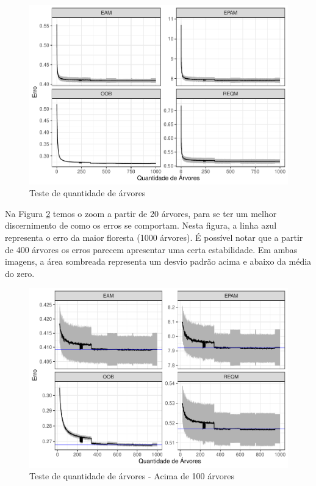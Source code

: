 \documentclass[
	12pt,				%
	a4paper,		%
	oneside,    %
	chapter=TITLE,		   %
	section=TITLE,		   %
	subsection=TITLE,	   %
	subsubsection=TITLE, %
	english,			%
	french,				%
	spanish,			%
	brazil,				%
]{abntex2}
\begin{document}
\begin{figure}
\centering
\includegraphics{00-TCC_files/figure-latex/qtd_arvores-1.pdf}
\caption{\label{qtd_arvores}Teste de quantidade de árvores}
\end{figure}

Na Figura \ref{qtd_arvores_zoom} temos o zoom a partir de 20 árvores,
para se ter um melhor discernimento de como os erros se comportam. Nesta
figura, a linha azul representa o erro da maior floresta (1000 árvores).
É possível notar que a partir de 400 árvores os erros parecem apresentar
uma certa estabilidade. Em ambas imagens, a área sombreada representa um
desvio padrão acima e abaixo da média do zero.

\begin{figure}
\centering
\includegraphics{00-TCC_files/figure-latex/qtd_arvores_zoom-1.pdf}
\caption{\label{qtd_arvores_zoom}Teste de quantidade de árvores - Acima
de 100 árvores}
\end{figure}
\end{document}
